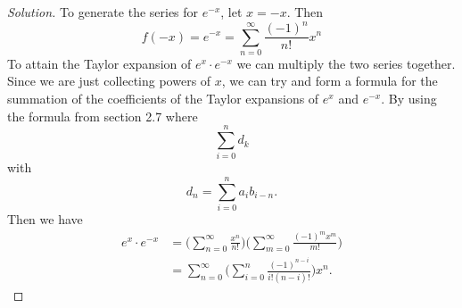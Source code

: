 \begin{enumerate}
        \begin{proof}[Solution]
        To generate the series for \( e^{-x} \), let \( x = -x  \). Then 
        \[  f(-x) = e^{-x} = \sum_{ n=0  }^{ \infty  } \frac{ (-1)^{n}  }{ n! } x^{n} \]
        To attain the Taylor expansion of \( e^{x} \cdot e^{-x } \) we can multiply the two series together. Since we are just collecting powers of \( x  \), we can try and form a formula for the summation of the coefficients of the Taylor expansions of \( e^{x} \) and \( e^{-x } \). By using the formula from section 2.7 where 
        \[  \sum_{ i=0 }^{ n } d_k \]
        with 
        \[  d_n = \sum_{ i=0 }^{ n } a_{i} b_{i -n}. \]
        Then we have 
        \begin{align*}
            e^{x} \cdot e^{-x} &=  \Big( \sum_{ n=0 }^{ \infty  } \frac{ x^{n} }{ n! }  \Big) \Big( \sum_{ m=0 }^{ \infty  } \frac{ (-1)^{m} x^{m} }{ m! }  \Big)  \\
                               &= \sum_{ n=0 }^{ \infty  } \Big( \sum_{ i=0 }^{ n } \frac{ (-1)^{n-i } }{ i! (n-i)! }  \Big) x^n.
        \end{align*}
        \end{proof}
\end{enumerate}

